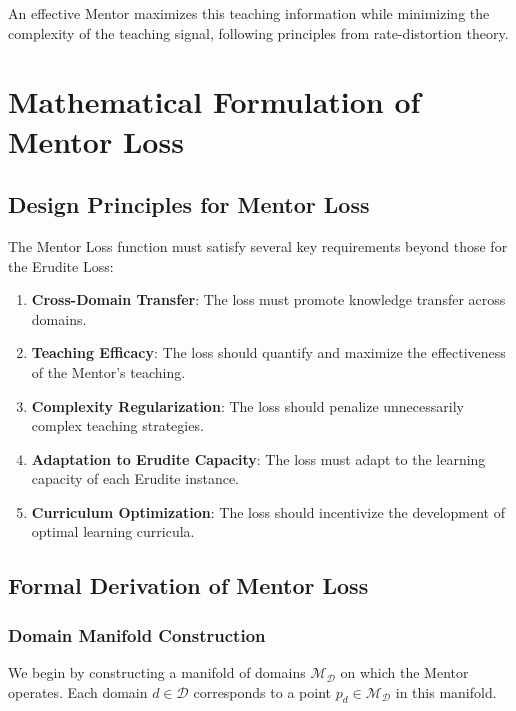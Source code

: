 An effective Mentor maximizes this teaching information while minimizing the complexity of the teaching signal, following principles from rate-distortion theory.

\section{Mathematical Formulation of Mentor Loss}

\subsection{Design Principles for Mentor Loss}

The Mentor Loss function must satisfy several key requirements beyond those for the Erudite Loss:

\begin{enumerate}
\item \textbf{Cross-Domain Transfer}: The loss must promote knowledge transfer across domains.

\item \textbf{Teaching Efficacy}: The loss should quantify and maximize the effectiveness of the Mentor's teaching.

\item \textbf{Complexity Regularization}: The loss should penalize unnecessarily complex teaching strategies.

\item \textbf{Adaptation to Erudite Capacity}: The loss must adapt to the learning capacity of each Erudite instance.

\item \textbf{Curriculum Optimization}: The loss should incentivize the development of optimal learning curricula.
\end{enumerate}

\subsection{Formal Derivation of Mentor Loss}

\subsubsection{Domain Manifold Construction}

We begin by constructing a manifold of domains $\mathcal{M}_{\mathcal{D}}$ on which the Mentor operates. Each domain $d \in \mathcal{D}$ corresponds to a point $p_d \in \mathcal{M}_{\mathcal{D}}$ in this manifold.


